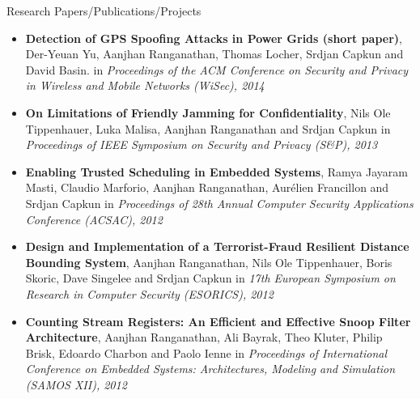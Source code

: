 \documentclass[11pt,oneside]{article}
\newenvironment{ressection}[1]{
	\vspace{4pt}
	{\fontfamily{phv}\selectfont\Large#1}
	\begin{itemize}
	\vspace{3pt}
}{
	\end{itemize}
}
\newcommand{\resitem}[1]{
	\vspace{-4pt}
	\item \begin{flushleft} #1 \end{flushleft}
}
\begin{document}


\begin{ressection}{Research Papers/Publications/Projects}

 \resitem{\textbf{Detection of GPS Spoofing Attacks in Power Grids (short paper)},
    Der-Yeuan Yu, Aanjhan Ranganathan, Thomas Locher, Srdjan Capkun and David Basin.
    in \emph{Proceedings of the ACM Conference on Security and Privacy
          in Wireless and Mobile Networks (WiSec), 2014}}

  \resitem{\textbf{On Limitations of Friendly Jamming for Confidentiality},
    Nils Ole Tippenhauer, Luka Malisa, Aanjhan Ranganathan and Srdjan Capkun
    in \emph{Proceedings of IEEE Symposium on Security and Privacy (S\&P),
      2013}}

  \resitem{\textbf{Enabling Trusted Scheduling in Embedded Systems}, Ramya
    Jayaram Masti, Claudio Marforio, Aanjhan Ranganathan, Aur\'elien
    Francillon and Srdjan Capkun in \emph{Proceedings of 28th Annual Computer
      Security Applications Conference (ACSAC), 2012}}

        \resitem{\textbf{Design and Implementation of a Terrorist-Fraud Resilient
          Distance Bounding System}, Aanjhan Ranganathan, Nils Ole
          Tippenhauer, Boris Skoric, Dave Singelee and Srdjan Capkun in \emph{17th
          European Symposium on Research in Computer Security (ESORICS), 2012}}

        \resitem{\textbf{Counting Stream Registers: An Efficient and Effective Snoop
          Filter Architecture}, Aanjhan Ranganathan, Ali Bayrak, Theo Kluter,
          Philip Brisk, Edoardo Charbon and Paolo Ienne in \emph{Proceedings of
          International Conference on Embedded Systems: Architectures,
          Modeling and Simulation (SAMOS XII), 2012}}


\end{ressection}
\end{document}
